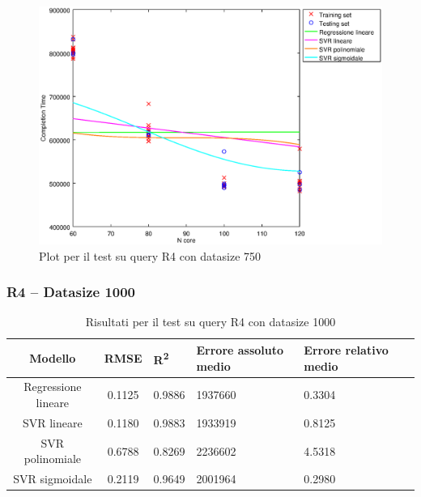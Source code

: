 \documentclass[a4paper,11pt]{article}
\begin{document}
\begin {figure}[hbtp]
\centering
\includegraphics[width=\textwidth]{output/R4_750/plot_R4_750.eps}
\caption {Plot per il test su query R4 con datasize 750}
\end {figure}
\newpage
\subsubsection{R4 -- Datasize 1000}

\begin{table}[bhpt]
	\centering
	\begin{adjustbox}{center}
		\begin{tabular}{c | c M{1cm} M{2.5cm} M{2.5cm} M{1.8cm}}
			Modello & RMSE & R\textsuperscript{2} & Errore assoluto medio & Errore relativo medio \tabularnewline
			\hline
			Regressione lineare & 0.1125 & 0.9886 & 1937660 & 0.3304 \\
			SVR lineare & 0.1180 & 0.9883 & 1933919 & 0.8125 \\
			SVR polinomiale & 0.6788 & 0.8269 & 2236602 & 4.5318 \\
			SVR sigmoidale & 0.2119 & 0.9649 & 2001964 & 0.2980 \\
		\end{tabular}
	\end{adjustbox}
	\\
	\caption{Risultati per il test su query R4 con datasize 1000}
	\label{table_R4_1000}
\end{table}
\end{document}
